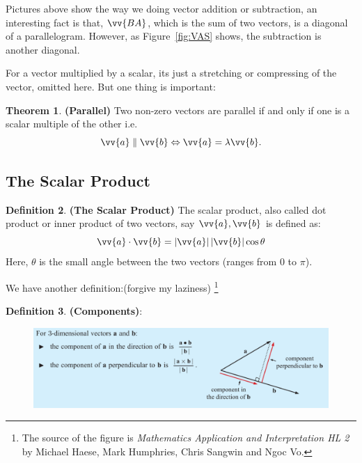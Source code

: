 \documentclass[12pt, a4paper, reqno]{amsart}
\theoremstyle{definition}
\newtheorem{theorem}{Theorem}[subsection] %
\newtheorem{definition}[theorem]{Definition} %
\numberwithin{equation}{section} %
\begin{document}
Pictures above show the way we doing vector addition or subtraction, an interesting fact is that, $\vv{BA}$, which is the sum of two vectors, is a diagonal of a parallelogram. However, as Figure~\ref{fig:VAS} shows, the subtraction is another diagonal.

For a vector multiplied by a scalar, its just a stretching or compressing of the vector, omitted here. But one thing is important:
\begin{theorem}\label{T:PARA} \textbf{(Parallel)}
	Two non-zero vectors are parallel if and only if one is a scalar multiple of the other i.e.
	\begin{equation}\label{E:PARA}
		\vv{a}\parallel \vv{b} \Leftrightarrow \vv{a}=\lambda \vv{b}.
	\end{equation}
\end{theorem}

\subsection{The Scalar Product}\label{SS:TSP}

\begin{definition}\label{D:SP} \textbf{(The Scalar Product)}
	The scalar product, also called dot product or inner product of two vectors, say $\vv{a}, \vv{b}$ is defined as:
	\begin{equation}\label{E:SP}
		\vv{a}\cdot \vv{b} = \left|\vv{a}\right|\left|\vv{b}\right|\cos \theta
	\end{equation}
	Here, $\theta$ is the small angle between the two vectors (ranges from $0$ to $\pi$).
\end{definition}

We have another definition:(forgive my laziness)
\footnote{The source of the figure is \textit{Mathematics Application and Interpretation HL 2} by Michael Haese, Mark Humphries, Chris Sangwin and Ngoc Vo.}
\begin{definition}\label{f:Components} \textbf{(Components)}:
	\begin{figure}[h]
		\centering\includegraphics[width=1\linewidth]{14.png}
		\caption{}
	\end{figure}
\end{definition}
\end{document}
